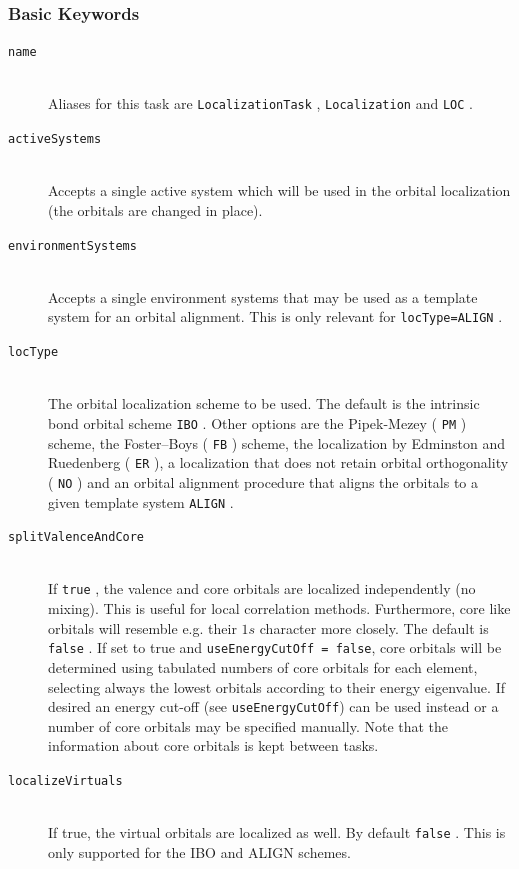 \documentclass[bibliography=totocnumbered,a4paper,10pt,oneside]{scrbook}
\newcommand{\ttt}[1]{%
  \begingroup\setlength{\fboxsep}{1pt}%
  \colorbox{serenity-green!30}{\texttt{\hspace*{2pt}\vphantom{(g}#1\hspace*{2pt}}}%
  \endgroup
}
\begin{document}
\subsubsection{Basic Keywords}
\begin{description}
 \item [\texttt{name}]\hfill \\
   Aliases for this task are \ttt{LocalizationTask}, \ttt{Localization} and \ttt{LOC}.
 \item [\texttt{activeSystems}]\hfill \\
   Accepts a single active system which will be used in the orbital localization
   (the orbitals are changed in place).
 \item [\texttt{environmentSystems}]\hfill \\
   Accepts a single environment systems that may be used as a template system for an orbital alignment.
   This is only relevant for \ttt{locType=ALIGN}.
 \item [\texttt{locType}]\hfill \\
   The orbital localization scheme to be used. The default is the intrinsic bond orbital scheme \ttt{IBO}.
   Other options are the  Pipek-Mezey (\ttt{PM}) scheme, the Foster--Boys (\ttt{FB}) scheme, the localization
   by Edminston and Ruedenberg (\ttt{ER}), a localization that does not retain orbital orthogonality
   (\ttt{NO}) and an orbital alignment procedure that aligns the orbitals to a given template system \ttt{ALIGN}\cite{Bensberg2020}.
 \item [\texttt{splitValenceAndCore}]\hfill \\
   If \ttt{true}, the valence and core orbitals are localized independently (no mixing). This is useful
   for local correlation methods. Furthermore, core like orbitals will resemble e.g. their $1s$ character
   more closely. The default is \ttt{false}. If set to true and \texttt{useEnergyCutOff = false}, core
   orbitals will be determined using tabulated  numbers of core orbitals for each element, selecting always
   the lowest orbitals according to their energy eigenvalue. If desired an energy cut-off
   (see \texttt{useEnergyCutOff}) can be used instead or a number of core orbitals may be specified manually.
   Note that the information about core orbitals is kept between tasks.
 \item [\texttt{localizeVirtuals}]\hfill \\
   If true, the virtual orbitals are localized as well. By default \ttt{false}. This is only supported for the IBO and ALIGN schemes.
\end{description}
\end{document}
